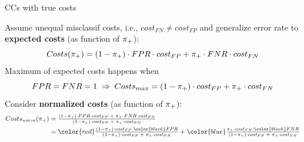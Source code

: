 \documentclass[11pt,compress,t,notes=noshow, xcolor=table]{beamer}
\begin{document}
\sloppy



\begin{vbframe}{CCs with true costs}

Assume unequal misclassif costs, i.e., $cost_{FN} \neq cost_{FP}$ and generalize error rate to \textbf{expected costs} (as function of $\pi_{+}$): %
$$Costs(\pi_{+}) = (1 - \pi_{+}) \cdot FPR \cdot cost_{FP} + \pi_{+} \cdot FNR \cdot cost_{FN}$$
Maximum of expected costs happens when
$$FPR=FNR=1 \; \Rightarrow \; Costs_{max} = (1 - \pi_{+}) \cdot cost_{FP} + \pi_{+} \cdot cost_{FN}$$
Consider \textbf{normalized costs} (as function of $\pi_{+}$):
\begin{align*}
Costs_{norm}(\rp)
&= \tfrac{(1 - \rp) \cdot FPR \cdot cost_{FP}  \; + \; \rp \cdot FNR \cdot cost_{FN} }{(1 - \rp) \cdot cost_{FP} \; + \; \rp \cdot cost_{FN}}\\
&= {\color{red}\tfrac{(1 - \rp)\cdot cost_{FP} \cdot {\color{black}FPR}}{(1 - \rp) \cdot cost_{FP} \; + \; \rp \cdot cost_{FN}}} + {\color{blue}\tfrac{\rp \cdot cost_{FN} \cdot {\color{black}FNR}}{(1 - \rp) \cdot cost_{FP} \; + \; \rp \cdot cost_{FN}}}
\end{align*}


\end{vbframe}
\end{document}
